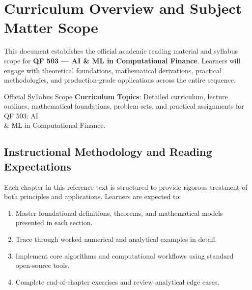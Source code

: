 \section{Curriculum Overview and Subject Matter Scope}

This document establishes the official academic reading material and syllabus scope for \textbf{QF 503 --- AI \& ML in Computational Finance}. Learners will engage with theoretical foundations, mathematical derivations, practical methodologies, and production-grade applications across the entire sequence.

\begin{InsightBox}{Official Syllabus Scope}
  \textbf{Curriculum Topics}: Detailed curriculum, lecture outlines, mathematical foundations, problem sets, and practical assignments for QF 503: AI \\& ML in Computational Finance.
\end{InsightBox}

\subsection{Instructional Methodology and Reading Expectations}

Each chapter in this reference text is structured to provide rigorous treatment of both principles and applications. Learners are expected to:
\begin{enumerate}
  \item Master foundational definitions, theorems, and mathematical models presented in each section.
  \item Trace through worked numerical and analytical examples in detail.
  \item Implement core algorithms and computational workflows using standard open-source tools.
  \item Complete end-of-chapter exercises and review analytical edge cases.
\end{enumerate}

